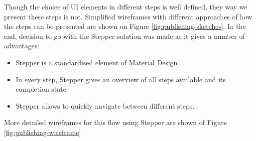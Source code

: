 \documentclass[thesis=B,english]{FITthesis}[2012/10/20]
\begin{document}
Though the choice of UI elements in different steps is well defined, they way we present these steps is not. Simplified wireframes with different approaches of how the steps can be presented are shown on Figure \ref{fig:publishing-sketches}. In the end, decision to go with the Stepper solution was made as it gives a number of advantages:
	\begin{itemize}
		\item Stepper is a standardised element of Material Design
		\item In every step, Stepper gives an overview of all steps available and its completion state
		\item Stepper allows to quickly navigate between different steps.
	\end{itemize}
	
	More detailed wireframes for this flow using Stepper are shown of Figure \ref{fig:publishing-wireframe}
\end{document}
